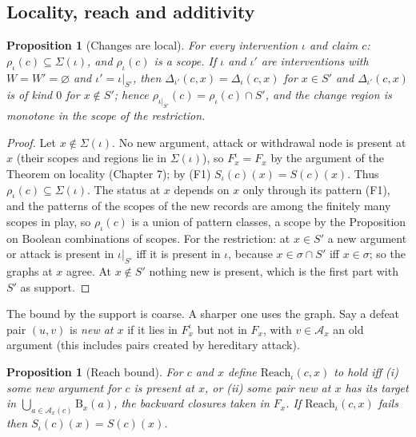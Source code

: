 \documentclass[11pt]{article}
\theoremstyle{plain}
\newtheorem{proposition}[theorem]{Proposition}
\theoremstyle{definition}
\theoremstyle{remark}
\newcommand{\Bc}{\mathrm{B}}
\newcommand{\Reach}{\mathrm{Reach}}
\begin{document}
\subsection{Locality, reach and additivity}

\begin{proposition}[Changes are local]\label{prop:local}
For every intervention $\iota$ and claim $c$: $\rho_\iota(c)\subseteq\Sigma(\iota)$, and $\rho_\iota(c)$ is a scope. If $\iota$ and $\iota'$ are interventions with $W=W'=\varnothing$ and $\iota'=\iota|_{S'}$, then $\Delta_{\iota'}(c,x)=\Delta_\iota(c,x)$ for $x\in S'$ and $\Delta_{\iota'}(c,x)$ is of kind $0$ for $x\notin S'$; hence $\rho_{\iota|_{S'}}(c)=\rho_\iota(c)\cap S'$, and the change region is monotone in the scope of the restriction.
\end{proposition}

\begin{proof}
Let $x\notin\Sigma(\iota)$. No new argument, attack or withdrawal node is present at $x$ (their scopes and regions lie in $\Sigma(\iota)$), so $F^\iota_x=F_x$ by the argument of the Theorem on locality (Chapter 7); by (F1) $S_\iota(c)(x)=S(c)(x)$. Thus $\rho_\iota(c)\subseteq\Sigma(\iota)$. The status at $x$ depends on $x$ only through its pattern (F1), and the patterns of the scopes of the new records are among the finitely many scopes in play, so $\rho_\iota(c)$ is a union of pattern classes, a scope by the Proposition on Boolean combinations of scopes. For the restriction: at $x\in S'$ a new argument or attack is present in $\iota|_{S'}$ iff it is present in $\iota$, because $x\in\sigma\cap S'$ iff $x\in\sigma$; so the graphs at $x$ agree. At $x\notin S'$ nothing new is present, which is the first part with $S'$ as support. \qedhere
\end{proof}

The bound by the support is coarse. A sharper one uses the graph. Say a defeat pair $(u,v)$ is \emph{new at $x$} if it lies in $F^\iota_x$ but not in $F_x$, with $v\in\mathcal A_x$ an old argument (this includes pairs created by hereditary attack).

\begin{proposition}[Reach bound]\label{prop:reach}
For $c$ and $x$ define $\Reach_\iota(c,x)$ to hold iff (i) some new argument for $c$ is present at $x$, or (ii) some pair new at $x$ has its target in $\bigcup_{a\in\mathcal A_x(c)}\Bc_x(a)$, the backward closures taken in $F_x$. If $\Reach_\iota(c,x)$ fails then $S_\iota(c)(x)=S(c)(x)$.
\end{proposition}
\end{document}

